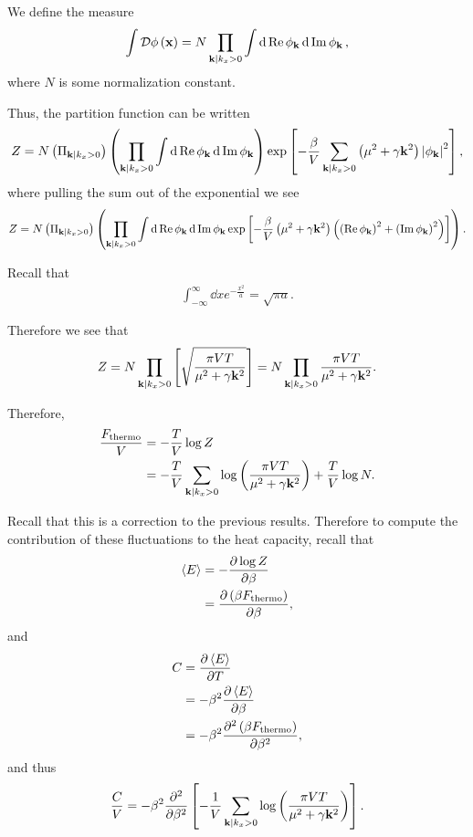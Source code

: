 We define the measure
\begin{align}
    \int \mathcal{D} \phi \left( \vb{x} \right) = N\prod_{\vb{k}  \mid k_x > 0} \int \dd{\Re \phi_{\vb{k}}} \dd{\Im \phi_{\vb{k}}}
,\end{align}
where $N$ is some normalization constant.

Thus, the partition function can be written
\begin{align}
    Z = N \left( \Pi_{\vb{k} | k_x > 0} \right) \left( \prod_{\vb{k}  \mid k_x > 0} \int \dd{\Re \phi_{\vb{k}}} \dd{\Im \phi_{\vb{k}}}  \right) \exp \left[ -\frac{\beta}{V} \sum_{\vb{k} | k_x > 0}^{} \left( \mu^2 + \gamma \vb{k}^2 \right) \left| \phi_{\vb{k}} \right|^2  \right] 
,\end{align}
where pulling the sum out of the exponential we see
\begin{align}
    Z = N \left( \Pi_{\vb{k} | k_x > 0} \right) \left( \prod_{\vb{k}  \mid k_x > 0} \int \dd{\Re \phi_{\vb{k}}} \dd{\Im \phi_{\vb{k}}}   \exp \left[ -\frac{\beta}{V} \left( \mu^2 + \gamma \vb{k}^2 \right)  \left( \left( \Re \phi_{\vb{k}} \right)^2 + \left( \Im \phi_{\vb{k}} \right)^2    \right)   \right] \right)
.\end{align}

Recall that 
\begin{align}
    \int_{-\infty}^{\infty} \dd{x} e^{-\frac{x^2}{a}} = \sqrt{\pi a} 
.\end{align}

Therefore we see that
\begin{align}
    Z = N \prod_{\vb{k}  \mid k_x > 0} \left[ \sqrt{\frac{\pi V T}{\mu^2 + \gamma \vb{k}^2}}  \right] = N  \prod_{\vb{k}  \mid k_x > 0} \frac{\pi V T}{\mu^2 + \gamma \vb{k}^2}
.\end{align}

Therefore,
\begin{align}
    \frac{F_\text{thermo}}{V} &= -\frac{T}{V} \log Z \\
    &= - \frac{T}{V} \sum_{\vb{k} | k_x > 0}^{} \log \left( \frac{\pi V T}{\mu^2 + \gamma \vb{k}^2} \right) + \frac{T}{V} \log N 
.\end{align}

Recall that this is a correction to the previous results. Therefore to compute the contribution of these fluctuations to the heat capacity, recall that
\begin{align}
    \left<E \right> &= - \pdv{\log Z}{\beta} \\
    &= \pdv{ \left( \beta F_\text{thermo} \right) }{\beta}
,\end{align}
and
\begin{align}
    C &= \pdv{ \left<E \right>}{T} \\
    &= -\beta^2 \pdv{\left<E \right>}{\beta} \\
    &= -\beta^2 \pdv[2]{\left( \beta F_\text{thermo} \right) }{\beta} 
,\end{align}
and thus
\begin{align}
    \frac{C}{V} = - \beta^2 \pdv[2]{\beta} \left[ -\frac{1}{V} \sum_{\vb{k} | k_x > 0}^{} \log \left( \frac{\pi V T}{\mu^2 + \gamma \vb{k}^2} \right)   \right] 
.\end{align}

